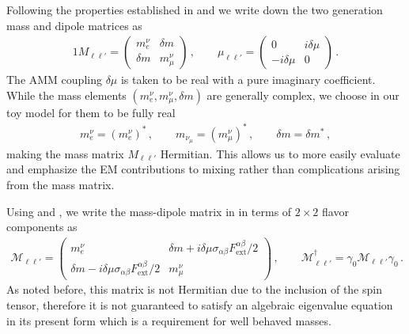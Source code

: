 Following the properties established in  and  we write down the two generation mass and dipole matrices as
\begin{alignat}{1}
\label{mix:1} M_{\ell\ell'}= 
\begin{pmatrix}
m_{e}^{\nu} & {\delta m}\\
{\delta m} & m_{\mu}^{\nu}
\end{pmatrix}\,,\qquad
\mu_{\ell\ell'} = 
\begin{pmatrix}
0 & i\delta\mu\\
-i\delta\mu & 0
\end{pmatrix}\,.
\end{alignat}
The AMM coupling $\delta\mu$ is taken to be real with a pure imaginary coefficient. While the mass elements $(m_{e}^{\nu},m_{\mu}^{\nu},{\delta m})$ are generally complex, we choose in our toy model for them to be fully real
\begin{align}
\label{choice:1}
m_{e}^{\nu}=(m_{e}^{\nu})^{*}\,,\qquad
m_{\nu_{\mu}}=(m_{\mu}^{\nu})^{*}\,,\qquad
\delta m=\delta m^{*}\,,
\end{align}
making the mass matrix $M_{\ell\ell'}$ Hermitian. This allows us to more easily evaluate and emphasize the EM contributions to mixing rather than complications arising from the mass matrix.

Using  and , we write the mass-dipole matrix in  in terms of $2\times2$ flavor components as
\begin{align}
\label{mix:2}
\mathcal{M}_{\ell\ell'} = 
\begin{pmatrix}
m_{e}^{\nu} & {\delta m}+i\delta\mu\sigma_{\alpha\beta}F^{\alpha\beta}_\mathrm{ext}/2\\
{\delta m}-i\delta\mu\sigma_{\alpha\beta}F^{\alpha\beta}_\mathrm{ext}/2 & m_{\mu}^{\nu}
\end{pmatrix}\,,\qquad
\mathcal{M}_{\ell\ell'}^{\dag}=\gamma_{0}\mathcal{M}_{\ell\ell'}\gamma_{0}\,.
\end{align}
As noted before, this matrix is not Hermitian due to the inclusion of the spin tensor, therefore it is not guaranteed to satisfy an algebraic eigenvalue equation in its present form which is a requirement for well behaved masses.

